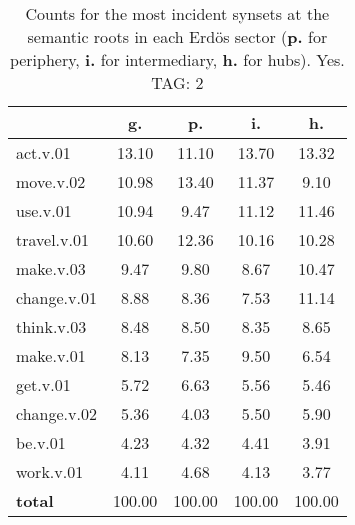 \begin{table}[h!]
\begin{center}
\begin{tabular}{| l | c | c | c | c |}\hline
 & g. & p. & i. & h. \\\hline
act.v.01 & 13.10  & 11.10  & 13.70  & 13.32 \\\hline
move.v.02 & 10.98  & 13.40  & 11.37  & 9.10 \\\hline
use.v.01 & 10.94  & 9.47  & 11.12  & 11.46 \\\hline
travel.v.01 & 10.60  & 12.36  & 10.16  & 10.28 \\\hline
make.v.03 & 9.47  & 9.80  & 8.67  & 10.47 \\\hline
change.v.01 & 8.88  & 8.36  & 7.53  & 11.14 \\\hline
think.v.03 & 8.48  & 8.50  & 8.35  & 8.65 \\\hline
make.v.01 & 8.13  & 7.35  & 9.50  & 6.54 \\\hline
get.v.01 & 5.72  & 6.63  & 5.56  & 5.46 \\\hline
change.v.02 & 5.36  & 4.03  & 5.50  & 5.90 \\\hline
be.v.01 & 4.23  & 4.32  & 4.41  & 3.91 \\\hline
work.v.01 & 4.11  & 4.68  & 4.13  & 3.77 \\\hline
{{\bf total}} & 100.00  & 100.00  & 100.00  & 100.00 \\\hline
\end{tabular}
\caption{Counts for the most incident synsets at the semantic roots in each Erd\"os sector ({\bf p.} for periphery, {\bf i.} for intermediary, {\bf h.} for hubs). Yes. TAG: 2}
\end{center}
\end{table}